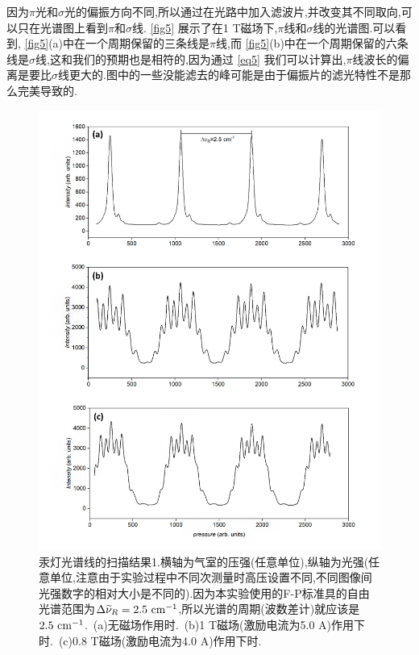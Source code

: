 \documentclass[font=default]{mpltx}
\begin{document}
因为$\pi$光和$\sigma$光的偏振方向不同,所以通过在光路中加入滤波片,并改变其不同取向,可以只在光谱图上看到$\pi$和$\sigma$线. \autoref{fig5} 展示了在1 T磁场下,$\pi$线和$\sigma$线的光谱图.可以看到, \autoref{fig5}(a)中在一个周期保留的三条线是$\pi$线,而 \autoref{fig5}(b)中在一个周期保留的六条线是$\sigma$线,这和我们的预期也是相符的,因为通过 \autoref{eq5} 我们可以计算出,$\pi$线波长的偏离是要比$\sigma$线更大的.图中的一些没能滤去的峰可能是由于偏振片的滤光特性不是那么完美导致的.
\begin{figure}
  \centering
  \includegraphics[width=0.95\linewidth]{fig/data1.png}
  \caption{汞灯光谱线的扫描结果1.横轴为气室的压强(任意单位),纵轴为光强(任意单位,注意由于实验过程中不同次测量时高压设置不同,不同图像间光强数字的相对大小是不同的).因为本实验使用的F-P标准具的自由光谱范围为$\Delta\widetilde{\nu}_R=2.5\ {\rm cm^{-1}}$,所以光谱的周期(波数差计)就应该是$2.5\ {\rm cm^{-1}}$.\ (a)无磁场作用时.\ (b)1 T磁场(激励电流为5.0 A)作用下时.\ (c)0.8 T磁场(激励电流为4.0 A)作用下时.}
  \label{fig3}
\end{figure}
\end{document}
